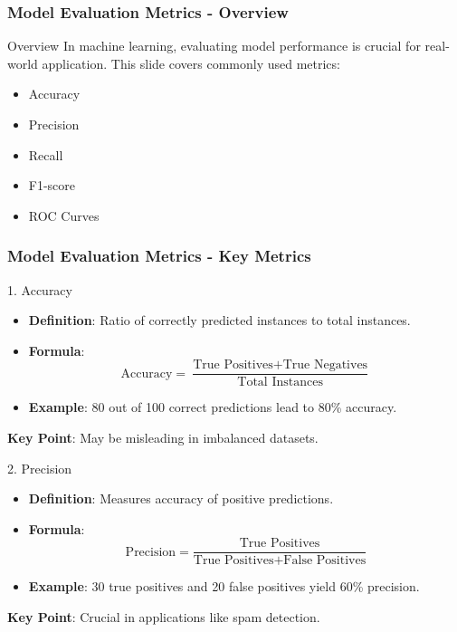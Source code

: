 \documentclass[aspectratio=169]{beamer}
\begin{document}
\begin{frame}[fragile]
    \frametitle{Model Evaluation Metrics - Overview}
    \begin{block}{Overview}
        In machine learning, evaluating model performance is crucial for real-world application. 
        This slide covers commonly used metrics:
        \begin{itemize}
            \item Accuracy
            \item Precision
            \item Recall
            \item F1-score
            \item ROC Curves
        \end{itemize}
    \end{block}
\end{frame}

\begin{frame}[fragile]
    \frametitle{Model Evaluation Metrics - Key Metrics}
    
    \begin{block}{1. Accuracy}
        \begin{itemize}
            \item \textbf{Definition}: Ratio of correctly predicted instances to total instances.
            \item \textbf{Formula}:
            \[
            \text{Accuracy} = \frac{\text{True Positives} + \text{True Negatives}}{\text{Total Instances}}
            \]
            \item \textbf{Example}: 80 out of 100 correct predictions lead to 80\% accuracy.
        \end{itemize}
        
        \textbf{Key Point}: May be misleading in imbalanced datasets.
    \end{block}
    
    \begin{block}{2. Precision}
        \begin{itemize}
            \item \textbf{Definition}: Measures accuracy of positive predictions.
            \item \textbf{Formula}:
            \[
            \text{Precision} = \frac{\text{True Positives}}{\text{True Positives} + \text{False Positives}}
            \]
            \item \textbf{Example}: 30 true positives and 20 false positives yield 60\% precision.
        \end{itemize}
        
        \textbf{Key Point}: Crucial in applications like spam detection.
    \end{block}
\end{frame}
\end{document}

